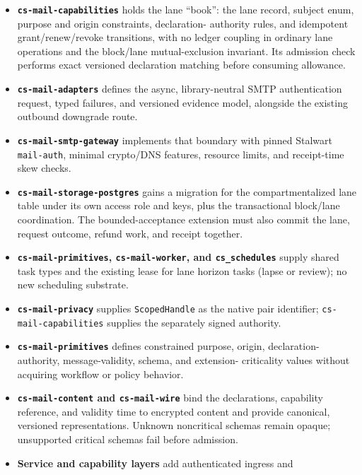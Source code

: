 \documentclass[11pt]{article}
\begin{document}
\begin{itemize}[leftmargin=2em]
    \item \textbf{\texttt{cs-mail-capabilities}} holds the lane ``book'': the
    lane record, subject enum, purpose and origin constraints, declaration-
    authority rules, and idempotent grant/renew/revoke transitions, with no ledger
    coupling in ordinary lane operations and the block/lane mutual-exclusion invariant. Its admission check
    performs exact versioned declaration matching before consuming allowance.
    \item \textbf{\texttt{cs-mail-adapters}} defines the async, library-neutral
    SMTP authentication request, typed failures, and versioned evidence model,
    alongside the existing outbound downgrade route.
    \item \textbf{\texttt{cs-mail-smtp-gateway}} implements that boundary with
    pinned Stalwart \texttt{mail-auth}, minimal crypto/DNS features, resource
    limits, and receipt-time skew checks.
    \item \textbf{\texttt{cs-mail-storage-postgres}} gains a migration for the
    compartmentalized lane table under its own access role and keys, plus the
    transactional block/lane coordination. The bounded-acceptance extension must
    also commit the lane, request outcome, refund work, and receipt together.\par
    \item \textbf{\texttt{cs-mail-primitives}, \texttt{cs-mail-worker}, and
    \texttt{cs\_schedules}} supply shared task types and the existing lease for
    lane horizon tasks (lapse or review); no new scheduling substrate.
    \item \textbf{\texttt{cs-mail-privacy}} supplies \texttt{ScopedHandle} as the
    native pair identifier; \texttt{cs-mail-capabilities} supplies the separately
    signed authority.
    \item \textbf{\texttt{cs-mail-primitives}} defines constrained purpose,
    origin, declaration-authority, message-validity, schema, and extension-
    criticality values without acquiring workflow or policy behavior.
    \item \textbf{\texttt{cs-mail-content} and \texttt{cs-mail-wire}} bind the
    declarations, capability reference, and validity time to encrypted content and
    provide canonical, versioned representations. Unknown noncritical schemas
    remain opaque; unsupported critical schemas fail before admission.
    \item \textbf{Service and capability layers} add authenticated ingress and

\end{itemize}
\end{document}
